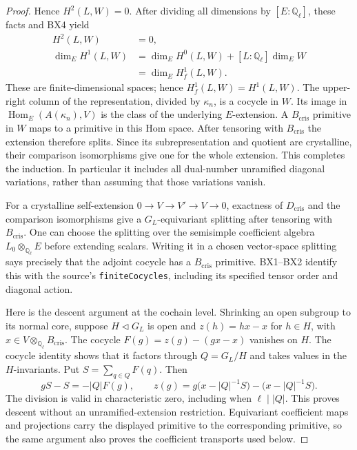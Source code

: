 \begin{proof}
Hence $H^2(L,W)=0$.
After dividing all dimensions by $[E:\mathbb Q_\ell]$, these
facts and BX4 yield
\[
 \begin{split}
 H^2(L,W)&=0,\\
 \dim_E H^1(L,W)&=\dim_E H^0(L,W)
                              +[L:\mathbb Q_\ell]\dim_E W\\
                    &=\dim_E H^1_f(L,W).
 \end{split}\tag{RX.11}
\]
These are finite-dimensional spaces; hence $H^1_f(L,W)=H^1(L,W)$.
The upper-right column of the representation, divided by
$\kappa_n$, is a cocycle in $W$.  Its image in
$\operatorname{Hom}_E(A(\kappa_n),V)$ is the class of the
underlying $E$-extension.  A $B_{\mathrm{cris}}$ primitive in $W$
maps to a primitive in this Hom space.  After tensoring with
$B_{\mathrm{cris}}$ the extension therefore splits.  Since its
subrepresentation and quotient are crystalline, their comparison
isomorphisms give one for the whole extension.  This completes the
induction.  In particular it includes all dual-number unramified
diagonal variations, rather than assuming that those variations vanish.

For a crystalline self-extension
$0\to V\to V'\to V\to0$, exactness of $D_{\mathrm{cris}}$
and the comparison isomorphisms give a $G_L$-equivariant splitting
after tensoring with $B_{\mathrm{cris}}$.
One can choose the splitting over the semisimple coefficient algebra
$L_0\otimes_{\mathbb Q_\ell}E$ before extending scalars.
Writing it in a chosen vector-space splitting says precisely that
the adjoint cocycle has a $B_{\mathrm{cris}}$ primitive.  BX1--BX2
identify this with the source's \texttt{finiteCocycles}, including
its specified tensor order and diagonal action.

Here is the descent argument at the cochain level.  Shrinking an open
subgroup to its normal core, suppose $H\lhd G_L$ is open and
$z(h)=hx-x$ for $h\in H$, with
$x\in V\otimes_{\mathbb Q_\ell}B_{\mathrm{cris}}$.
The cocycle $F(g)=z(g)-(gx-x)$ vanishes on $H$.  The cocycle identity
shows that it factors through $Q=G_L/H$ and takes values in the
$H$-invariants.  Put $S=\sum_{q\in Q}F(q)$.  Then
\[
     gS-S=-|Q|F(g),\qquad
     z(g)=g\bigl(x-|Q|^{-1}S\bigr)
                         -\bigl(x-|Q|^{-1}S\bigr).
 \tag{RX.12}
\]
The division is valid in characteristic zero, including when
$\ell\mid|Q|$.  This proves descent without an unramified-extension
restriction.  Equivariant coefficient maps and projections carry
the displayed primitive to the corresponding primitive, so the same
argument also proves the coefficient transports used below.
\end{proof}

